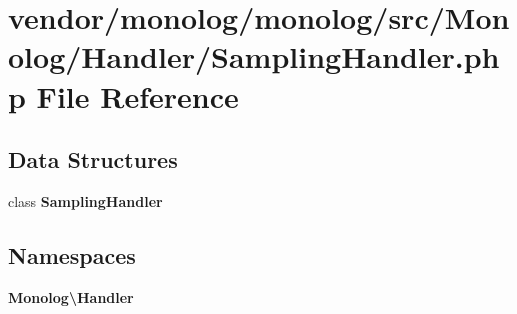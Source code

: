 \section{vendor/monolog/monolog/src/\+Monolog/\+Handler/\+Sampling\+Handler.php File Reference}
\label{_sampling_handler_8php}
\subsection*{Data Structures}
\begin{DoxyCompactItemize}
\item 
class {\bf Sampling\+Handler}
\end{DoxyCompactItemize}
\subsection*{Namespaces}
\begin{DoxyCompactItemize}
\item 
 {\bf Monolog\textbackslash{}\+Handler}
\end{DoxyCompactItemize}
